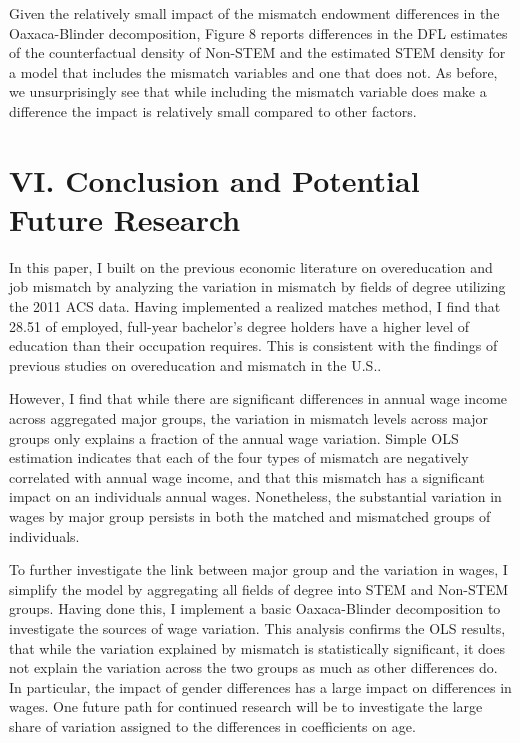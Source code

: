 \documentclass[11pt]{article}
\theoremstyle{definition}
\begin{document}
Given the relatively small impact of the mismatch endowment differences in the Oaxaca-Blinder decomposition, Figure 8 reports differences in the DFL estimates of the counterfactual density of Non-STEM and the estimated STEM density for a model that includes the mismatch variables and one that does not.  As before, we unsurprisingly see that while including the mismatch variable does make a difference the impact is relatively small compared to other factors.  

\section*{VI. Conclusion and Potential Future Research}

In this paper, I built on the previous economic literature on overeducation and job mismatch by analyzing the variation in mismatch by fields of degree utilizing the 2011 ACS data.  Having implemented a realized matches method, I find that 28.51 of employed, full-year bachelor's degree holders have a higher level of education than their occupation requires.  This is consistent with the findings of previous studies on overeducation and mismatch in the U.S..  

However, I find that while there are significant differences in annual wage income across aggregated major groups, the variation in mismatch levels across major groups only explains a fraction of the annual wage variation.  Simple OLS estimation indicates that each of the four types of mismatch are negatively correlated with annual wage income, and that this mismatch has a significant impact on an individuals annual wages.  Nonetheless, the substantial variation in wages by major group persists in both the matched and mismatched groups of individuals.    

To further investigate the link between major group and the variation in wages, I simplify the model by aggregating all fields of degree into STEM and Non-STEM groups.  Having done this, I implement a basic Oaxaca-Blinder decomposition to investigate the sources of wage variation.  This analysis confirms the OLS results, that while the variation explained by mismatch is statistically significant, it does not explain the variation across the two groups as much as other differences do.  In particular, the impact of gender differences has a large impact on differences in wages.  One future path for continued research will be to investigate the large share of variation assigned to the differences in coefficients on age.    
\end{document}
